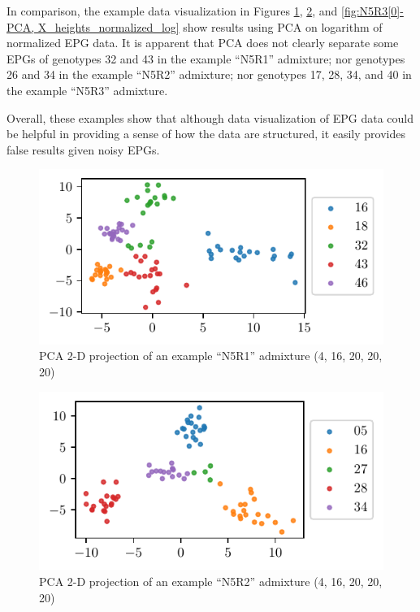 In comparison, the example data visualization in Figures \ref{fig:N5R1[0]-PCA, X_heights_normalized_log}, \ref{fig:N5R2[0]-PCA, X_heights_normalized_log}, and \ref{fig:N5R3[0]-PCA, X_heights_normalized_log} show results using PCA on logarithm of normalized EPG data. It is apparent that PCA does not clearly separate some EPGs of genotypes 32 and 43 in the example ``N5R1'' admixture; nor genotypes 26 and 34 in the example ``N5R2'' admixture; nor genotypes 17, 28, 34, and 40 in the example ``N5R3'' admixture.

Overall, these examples show that although data visualization of EPG data could be helpful in providing a sense of how the data are structured, it easily provides false results given noisy EPGs.

\begin{figure}
\centering
\includegraphics{./figures/data_visualization/N5R1[0]-PCA, X_heights_normalized_log.pdf}
\caption{PCA 2-D projection of an example ``N5R1'' admixture (4, 16, 20, 20, 20)}
\label{fig:N5R1[0]-PCA, X_heights_normalized_log}
\end{figure}
\begin{figure}
\centering
\includegraphics{./figures/data_visualization/N5R2[0]-PCA, X_heights_normalized_log.pdf}
\caption{PCA 2-D projection of an example ``N5R2'' admixture (4, 16, 20, 20, 20)}
\label{fig:N5R2[0]-PCA, X_heights_normalized_log}
\end{figure}
